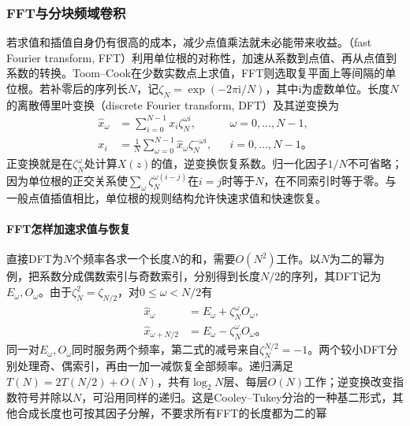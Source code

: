 \subsubsection{FFT与分块频域卷积}
\label{sec:cnn-fft}

若求值和插值自身仍有很高的成本，减少点值乘法就未必能带来收益。（fast Fourier transform, FFT）利用单位根的对称性，加速从系数到点值、再从点值到系数的转换。Toom--Cook在少数实数点上求值，FFT则选取复平面上等间隔的单位根。若补零后的序列长$N$，记$\zeta_N=\exp(-2\pi\mathrm i/N)$，其中$\mathrm i$为虚数单位。长度$N$的离散傅里叶变换（discrete Fourier transform, DFT）及其逆变换为
\begin{equation}
  \begin{aligned}
    \widehat x_\omega&=\sum_{i=0}^{N-1}x_i\zeta_N^{\omega i},
       &&\omega=0,\ldots,N-1,\\
    x_i&=\frac1N\sum_{\omega=0}^{N-1}
                    \widehat x_\omega\zeta_N^{-\omega i},
       &&i=0,\ldots,N-1\text{。}
  \end{aligned}
  \label{eq:cnn-dft-inverse}
\end{equation}
正变换就是在$\zeta_N^\omega$处计算$X(z)$的值，逆变换恢复系数。归一化因子$1/N$不可省略；因为单位根的正交关系使$\sum_\omega\zeta_N^{\omega(i-j)}$在$i=j$时等于$N$，在不同索引时等于零。与一般点值插值相比，单位根的规则结构允许快速求值和快速恢复。

\paragraph{FFT怎样加速求值与恢复}

直接DFT为$N$个频率各求一个长度$N$的和，需要$O(N^2)$工作。以$N$为二的幂为例，把系数分成偶数索引与奇数索引，分别得到长度$N/2$的序列，其DFT记为$E_\omega,O_\omega$。由于$\zeta_N^2=\zeta_{N/2}$，对$0\leq\omega<N/2$有
\begin{equation}
  \begin{aligned}
    \widehat x_\omega&=E_\omega+\zeta_N^\omega O_\omega,\\
    \widehat x_{\omega+N/2}&=E_\omega-\zeta_N^\omega O_\omega\text{。}
  \end{aligned}
  \label{eq:cnn-fft-butterfly}
\end{equation}
同一对$E_\omega,O_\omega$同时服务两个频率，第二式的减号来自$\zeta_N^{N/2}=-1$。两个较小DFT分别处理奇、偶索引，再由一加一减恢复全部频率。递归满足$T(N)=2T(N/2)+O(N)$，共有$\log_2N$层、每层$O(N)$工作；逆变换改变指数符号并除以$N$，可沿用同样的递归。这是Cooley--Tukey分治的一种基二形式，其他合成长度也可按其因子分解，不要求所有FFT的长度都为二的幂

